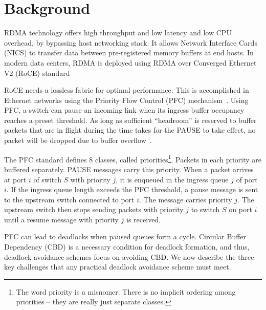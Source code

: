 \section{Background} \label{sec:background}  RDMA
technology offers high throughput and low latency and low CPU overhead, by
bypassing host networking stack. It allows Network Interface Cards (NICS) to
transfer data between pre-registered memory buffers at end hosts.  In modern
data centers, RDMA is deployed using RDMA over Converged Ethernet V2 (RoCE)
standard~\cite{rroce}

 RoCE needs a lossless fabric for optimal performance. This is
accomplished in Ethernet networks using the Priority Flow Control (PFC)
mechanism~\cite{pfc}.  Using PFC, a switch can pause an incoming link when its
ingress buffer occupancy reaches a preset threshold. As long as sufficient
``headroom'' is reserved to buffer packets that are in flight during the time
takes for the PAUSE to take effect, no packet will be dropped due to buffer
overflow~\cite{cisco-whitepaper,dcqcn}.

The PFC standard defines 8 classes, called priorities\footnote{The word priority
is a misnomer. There is no implicit ordering among priorities -- they are really
just separate classes.}. Packets in each priority are buffered separately.
PAUSE messages carry this priority.  When a packet arrives at port $i$ of switch
$S$ with priority $j$, it is enqueued in the ingress queue $j$ of port $i$. If the ingress queue
length exceeds the PFC threshold, a pause message is sent to the upstream
switch connected to port $i$. The message carries priority $j$. The upstream
switch then stops sending packets with priority $j$ to switch $S$ on port $i$
until a resume message with priority $j$ is received.

 PFC can lead to deadlocks when paused queues form a cycle.
Circular Buffer Dependency (CBD) is a necessary condition for
deadlock formation, and thus, deadlock avoidance schemes focus on
avoiding CBD.  We now describe the three key challenges that any
practical deadlock avoidance scheme must meet.
